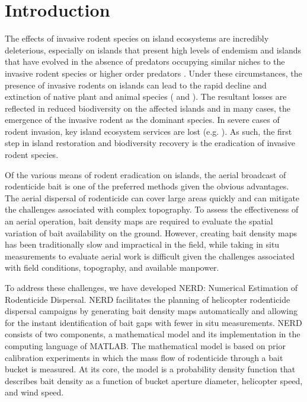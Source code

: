\section{Introduction}
The effects of invasive rodent species on island ecosystems are incredibly deleterious, especially on islands that present high levels of endemism and islands that have evolved in the absence of predators occupying similar niches to the invasive rodent species or higher order predators \cite{Meyers2000}. Under these circumstances, the presence of invasive rodents on islands can lead to the rapid decline and extinction of native plant and animal species (\cite{Medina2011} and \cite{Towns2006}). The resultant losses are reflected in reduced biodiversity on the affected islands and in many cases, the emergence of the invasive rodent as the dominant species. In severe cases of rodent invasion, key island ecosystem services are lost (e.g. \cite{Towns2006}). As such, the first step in island restoration and biodiversity recovery is the eradication of invasive rodent species.

Of the various means of rodent eradication on islands, the aerial broadcast of rodenticide bait is one of the preferred methods given the obvious advantages. The aerial dispersal of rodenticide can cover large areas quickly and can mitigate the challenges associated with complex topography. To assess the effectiveness of an aerial operation, bait density maps are required to evaluate the spatial variation of bait availability on the ground. However, creating bait density maps has been traditionally slow and impractical in the field, while taking in situ measurements to evaluate aerial work is difficult given the challenges associated with field conditions, topography, and available manpower.

To address these challenges, we have developed NERD: Numerical Estimation of Rodenticide Dispersal. NERD facilitates the planning of helicopter rodenticide dispersal campaigns by generating bait density maps automatically and allowing for the instant identification of bait gaps with fewer in situ measurements. NERD consists of two components, a mathematical model and its implementation in the computing language of MATLAB. The mathematical model is based on prior calibration experiments in which the mass flow of rodenticide through a bait bucket is measured. At its core, the model is a probability density function that describes bait density as a function of bucket aperture diameter, helicopter speed, and wind speed.
